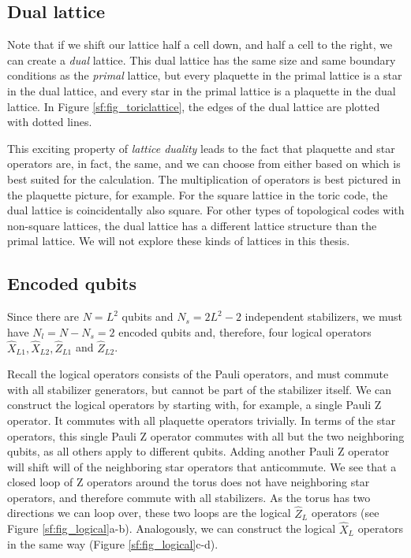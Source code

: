 \subsection{Dual lattice}
Note that if we shift our lattice half a cell down, and half a cell to the right, we can create a \emph{dual} lattice. This dual lattice has the same size and same boundary conditions as the \emph{primal} lattice, but every plaquette in the primal lattice is a star in the dual lattice, and every star in the primal lattice is a plaquette in the dual lattice. In Figure \ref{sf:fig_toriclattice}, the edges of the dual lattice are plotted with dotted lines.

This exciting property of \emph{lattice duality} leads to the fact that plaquette and star operators are, in fact, the same, and we can choose from either based on which is best suited for the calculation. The multiplication of operators is best pictured in the plaquette picture, for example. For the square lattice in the toric code, the dual lattice is coincidentally also square. For other types of topological codes with non-square lattices, the dual lattice has a different lattice structure than the primal lattice. We will not explore these kinds of lattices in this thesis.

\subsection{Encoded qubits}
Since there are $N = L^2$ qubits and $N_s = 2L^2 - 2$ independent stabilizers, we must have $N_l = N - N_s = 2$ encoded qubits and, therefore, four logical operators $\hat{X}_{L1}, \hat{X}_{L2}, \hat{Z}_{L1}$ and $\hat{Z}_{L2}$.

Recall the logical operators consists of the Pauli operators, and must commute with all stabilizer generators, but cannot be part of the stabilizer itself. We can construct the logical operators by starting with, for example, a single Pauli Z operator. It commutes with all plaquette operators trivially. In terms of the star operators, this single Pauli Z operator commutes with all but the two neighboring qubits, as all others apply to different qubits. Adding another Pauli Z operator will shift will of the neighboring star operators that anticommute. We see that a closed loop of Z operators around the torus does not have neighboring star operators, and therefore commute with all stabilizers. As the torus has two directions we can loop over, these two loops are the logical $\hat{Z}_L$ operators (see Figure \ref{sf:fig_logical}a-b). Analogously, we can construct the logical $\hat{X}_L$ operators in the same way (Figure \ref{sf:fig_logical}c-d).

